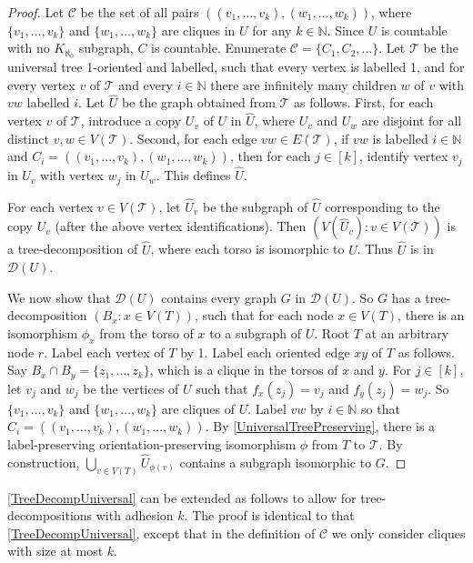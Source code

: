 \documentclass[a4paper,11pt]{article}
\theoremstyle{plain}
\theoremstyle{definition}
\newcommand{\CC}{\mathcal{C}}
\newcommand{\DD}{\mathcal{D}}
\newcommand{\TT}{\mathcal{T}}
\newcommand{\NN}{\mathbb{N}}
\begin{document}
\begin{proof}
Let $\CC$ be the set of all pairs $((v_1,\dots,v_k),(w_1,\dots,w_k))$, where $\{v_1,\dots,v_k\}$  and $\{w_1,\dots,w_k\}$ are cliques in $U$ for any $k\in\NN$. Since $U$ is countable with no $K_{\aleph_0}$ subgraph, $C$ is countable. Enumerate $\CC=\{C_1,C_2,\dots\}$.  Let $\TT$ be the universal tree 1-oriented and labelled, such that every vertex is labelled 1, and for every vertex $v$ of $\TT$ and every $i\in\NN$ there are infinitely many children $w$ of $v$ with $vw$ labelled $i$. Let $\widehat{U}$ be the graph obtained from $\TT$ as follows. First, for each vertex $v$ of $\TT$, introduce a copy $U_v$ of $U$ in $\widehat{U}$, where $U_v$ and $U_w$ are disjoint for all distinct $v,w\in V(\TT)$. Second, for each edge $vw\in E(\TT)$, if $vw$ is labelled $i\in\NN$ and $C_i=((v_1,\dots,v_k),(w_1,\dots,w_k))$, then for each $j\in[k]$, identify vertex $v_j$ in $U_v$ with vertex $w_j$ in $U_w$. This defines $\widehat{U}$. 

For each vertex $v\in V(\TT)$, let $\widehat{U}_v$ be the subgraph of $\widehat{U}$ corresponding to the copy $U_v$ (after the above vertex identifications). Then $(V(\widehat{U}_v):v\in V(\TT))$ is a tree-decomposition of $\widehat{U}$, where each torso is isomorphic to $U$. Thus $\widehat{U}$ is in $\DD(U)$. 

We now show that $\DD(U)$ contains every graph $G$ in $\DD(U)$. So $G$ has a tree-decomposition $(B_x:x\in V(T))$, such that for each node $x\in V(T)$, there is an isomorphism $\phi_x$ from the torso of $x$ to a subgraph of $U$. Root $T$ at an arbitrary node $r$. Label each vertex of $T$ by 1. Label each oriented edge $xy$ of $T$ as follows. Say $B_x\cap B_y=\{z_1,\dots,z_k\}$, which is a clique in the torsos of $x$ and $y$. For $j\in[k]$, let $v_j$ and $w_j$ be the vertices of $U$ such that $f_x(z_j)=v_j$ and $f_y(z_j)=w_j$. So $\{v_1,\dots,v_k\}$ and $\{w_1,\dots,w_k\}$ are cliques of $U$.  Label $vw$ by $i\in\NN$ so that $C_i= ((v_1,\dots,v_k),(w_1,\dots,w_k))$. By \cref{UniversalTreePreserving}, there is a label-preserving orientation-preserving isomorphism $\phi$ from $T$ to $\TT$. 
By construction, $\bigcup_{v\in V(T)}\widehat{U}_{\phi(v)}$ contains a subgraph isomorphic to $G$.
\end{proof}

\cref{TreeDecompUniversal} can be extended as follows to allow for tree-decompositions with adhesion $k$. The proof is identical to that  \cref{TreeDecompUniversal}, except that in the definition of $\CC$ we only consider cliques with size at most $k$.
\end{document}
